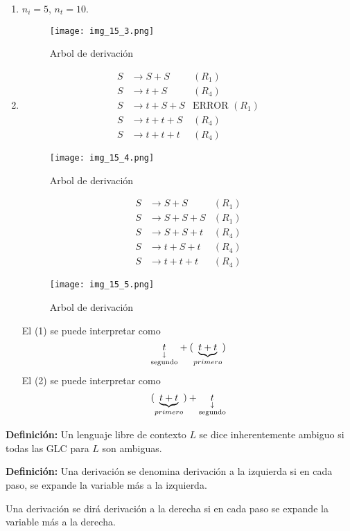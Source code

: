 \begin{enumerate}
\item $n_i=5$, $n_t=10$.
\begin{figure}[h!]
\centering
\texttt{[image: img\_15\_3.png]}
\caption{Arbol de derivación}\label{img_15_3}
\end{figure}
\item 
\begin{align*}
S	&\rightarrow S+S	&(R_1)	\\
S	&\rightarrow t+S	&(R_4)	\\
S	&\rightarrow t+S+S	&\mbox{ERROR }(R_1)	\\
S	&\rightarrow t+t+S	&(R_4)	\\
S	&\rightarrow t+t+t	&(R_4)
\end{align*}
\begin{figure}[h!]
\centering
\texttt{[image: img\_15\_4.png]}
\caption{Arbol de derivación}\label{img_15_4}
\end{figure}

\begin{align*}
S	&\rightarrow S+S	&(R_1)	\\
S	&\rightarrow S+S+S	&(R_1)	\\
S	&\rightarrow S+S+t	&(R_4)	\\
S	&\rightarrow t+S+t	&(R_4)	\\
S	&\rightarrow t+t+t	&(R_4)
\end{align*}
\begin{figure}[h!]
\centering
\texttt{[image: img\_15\_5.png]}
\caption{Arbol de derivación}\label{img_15_5}
\end{figure}

El (1) se puede interpretar como
$$\downlegend{t}{segundo}+(\underbrace{t+t}_{primero})$$
El (2) se puede interpretar como
$$(\underbrace{t+t}_{primero})+\downlegend{t}{segundo}$$
\end{enumerate}

\textbf{Definición: }Un lenguaje libre de contexto $L$ se dice inherentemente ambiguo si todas las GLC para $L$ son ambiguas.


\textbf{Definición: }Una derivación se denomina derivación a la izquierda si en cada paso, se expande la variable más a la izquierda.

Una derivación se dirá derivación a la derecha si en cada paso se expande la variable más a la derecha.

